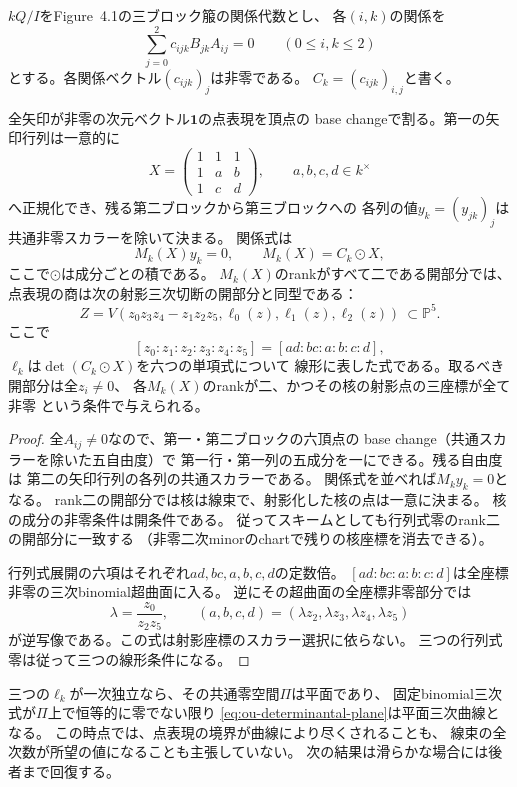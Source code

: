$kQ/I$をFigure~4.1の三ブロック箙の関係代数とし、
各$(i,k)$の関係を
\[
 \sum_{j=0}^2 c_{ijk} B_{jk}A_{ij}=0
 \qquad (0\leq i,k\leq2)
\]
とする。各関係ベクトル$(c_{ijk})_j$は非零である。
$C_k=(c_{ijk})_{i,j}$と書く。

\begin{proposition}[全矢印非零の点表現の行列式射影]
\label{prop:ou-full-support-determinant}
全矢印が非零の次元ベクトル$\mathbf1$の点表現を頂点の
base changeで割る。第一の矢印行列は一意的に
\[
 X=\begin{pmatrix}1&1&1\\1&a&b\\1&c&d\end{pmatrix},
 \qquad a,b,c,d\in k^\times
\]
へ正規化でき、残る第二ブロックから第三ブロックへの
各列の値$y_k=(y_{jk})_j$は共通非零スカラーを除いて決まる。
関係式は
\[
 M_k(X)y_k=0,\qquad M_k(X)=C_k\odot X,
\]
ここで$\odot$は成分ごとの積である。
$M_k(X)$のrankがすべて二である開部分では、
点表現の商は次の射影三次切断の開部分と同型である：
\begin{equation}\label{eq:ou-determinantal-plane}
 Z=V(z_0z_3z_4-z_1z_2z_5,\ell_0(z),\ell_1(z),\ell_2(z))
 \ \subset\mathbb P^5 .
\end{equation}
ここで
\[
 [z_0:z_1:z_2:z_3:z_4:z_5]=[ad:bc:a:b:c:d],
\]
$\ell_k$は$\det(C_k\odot X)$を六つの単項式について
線形に表した式である。取るべき開部分は全$z_i\ne0$、
各$M_k(X)$のrankが二、かつその核の射影点の三座標が全て非零
という条件で与えられる。
\end{proposition}
\begin{proof}
全$A_{ij}\ne0$なので、第一・第二ブロックの六頂点の
base change（共通スカラーを除いた五自由度）で
第一行・第一列の五成分を一にできる。残る自由度は
第二の矢印行列の各列の共通スカラーである。
関係式を並べれば$M_ky_k=0$となる。
rank二の開部分では核は線束で、射影化した核の点は一意に決まる。
核の成分の非零条件は開条件である。
従ってスキームとしても行列式零のrank二の開部分に一致する
（非零二次minorのchartで残りの核座標を消去できる）。

行列式展開の六項はそれぞれ$ad,bc,a,b,c,d$の定数倍。
$[ad:bc:a:b:c:d]$は全座標非零の三次binomial超曲面に入る。
逆にその超曲面の全座標非零部分では
\[
 \lambda=\frac{z_0}{z_2z_5},\qquad
 (a,b,c,d)=(\lambda z_2,\lambda z_3,\lambda z_4,\lambda z_5)
\]
が逆写像である。この式は射影座標のスカラー選択に依らない。
三つの行列式零は従って三つの線形条件になる。
\end{proof}

三つの$\ell_k$が一次独立なら、その共通零空間$\Pi$は平面であり、
固定binomial三次式が$\Pi$上で恒等的に零でない限り
\eqref{eq:ou-determinantal-plane}は平面三次曲線となる。
この時点では、点表現の境界が曲線により尽くされることも、
線束の全次数が所望の値になることも主張していない。
次の結果は滑らかな場合には後者まで回復する。

